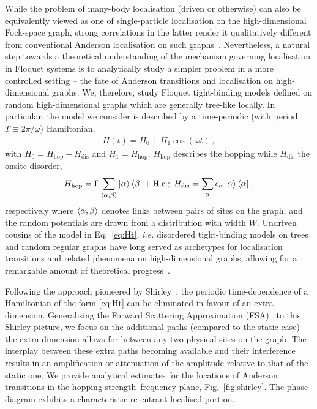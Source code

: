 \documentclass[aps,prl,twocolumn,superscriptaddress,nobalancelastpage,longbibliography]{revtex4-2}
\newcommand\eq[1]{\begin{align}#1\end{align}}
\begin{document}
While the problem of many-body localisation (driven or otherwise) can also be equivalently viewed as one of single-particle localisation on the high-dimensional Fock-space graph, strong correlations in the latter render it qualitatively different from conventional Anderson localisation on such graphs~\cite{roy2020fock,roy2020localisation}.
Nevertheless, a natural step towards a theoretical understanding of the mechanism governing localisation in Floquet systems is to analytically study a simpler problem in a more controlled setting -- the fate of Anderson transitions and localisation on high-dimensional graphs.
We, therefore, study Floquet tight-binding models defined on random high-dimensional graphs which are generally tree-like locally.
In particular, the model we consider is described by a time-periodic (with period $T\equiv2\pi/\omega$) Hamiltonian,
\eq{
H(t) = H_0 + H_1\cos(\omega t)\,,
\label{eq:Ht}
}
with $H_0=H_\mathrm{hop} + H_\mathrm{dis}$ and $H_1=H_\mathrm{hop}$. $H_\mathrm{hop}$ describes the hopping  while $H_\mathrm{dis}$ the onsite disorder, 
\eq{
    H_\mathrm{hop} = \Gamma\sum_{\braket{\alpha,\beta}}\ket{\alpha}\bra{\beta}+\mathrm{H.c.};\; H_\mathrm{dis}=\sum_\alpha\epsilon_\alpha\ket{\alpha}\bra{\alpha}\,,
    \label{eq:H-hop-dis}
}
respectively where $\braket{\alpha,\beta}$ denotes links between pairs of sites on the graph, and the random potentials are drawn from a distribution with width $W$.
Undriven cousins of the model in Eq.~\ref{eq:Ht}, \textit{i.e.} disordered tight-binding models on trees and random regular graphs have long served as archetypes for localisation transitions and related phenomena on high-dimensional graphs, allowing for a remarkable amount of theoretical progress~\cite{abou-chacra1973self,chalker1990anderson,evers2008anderson,luca2014anderson,altshuler2016multifractal,tikhonov2016anderson,garciamata2017scaling,sonner2017multifractality,biroli2018delocalization,kravtsov2018nonergodic,tikhonov2019critical,savitz2019anderson,garciamata2020two,tarzia2020manybody,biroli2017delocalized,biroli2020anomalous}.







Following the approach pioneered by Shirley~\cite{shirley1965solution,sambe1973steady}, the periodic time-dependence of a Hamiltonian of the form \eqref{eq:Ht} can be eliminated in favour of an extra dimension. Generalising the Forward Scattering Approximation (FSA)~\cite{pietracaprina2016forward} to this Shirley picture, we focus on the additional paths (compared to the static case) the extra dimension allows for between any two physical sites on the graph. The interplay between these extra paths becoming available and their interference results in an amplification or attenuation of the amplitude relative to that of the static one. We provide analytical estimates for the locations of Anderson transitions in the hopping strength--frequency plane, Fig.~\ref{fig:shirley}. 
The phase diagram exhibits a characteristic re-entrant localised portion.
\end{document}

